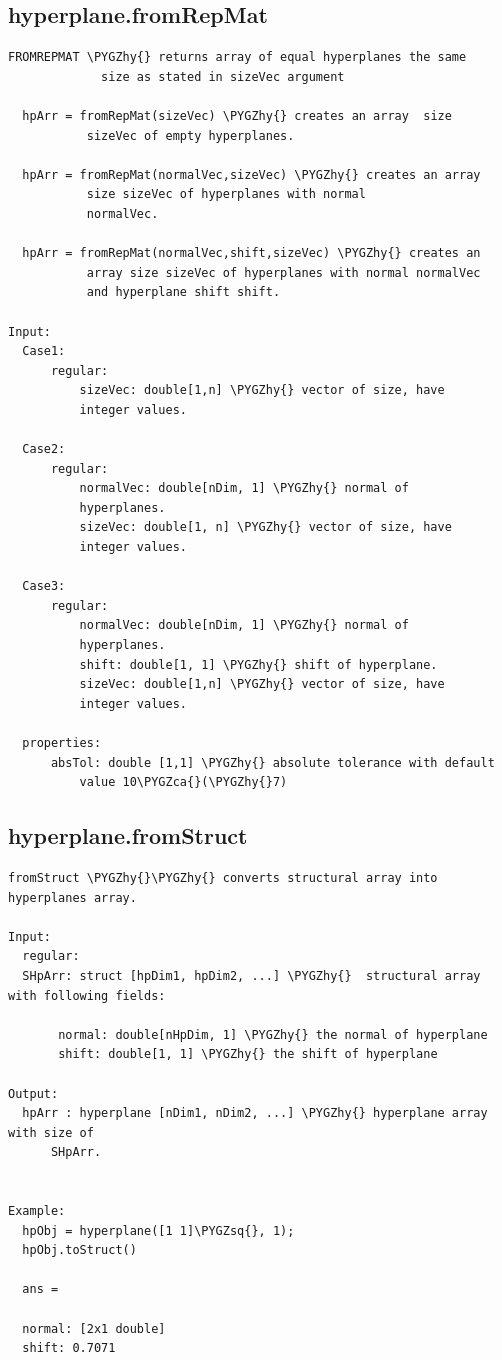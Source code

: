 \documentclass[letterpaper,10pt,english]{sphinxmanual}
\def\PYGZca{\char`\^}
\def\PYGZhy{\char`\-}
\def\PYGZsq{\char`\'}
\begin{document}
\subsection{hyperplane.fromRepMat}
\label{chap_functions:hyperplane-fromrepmat}
\begin{Verbatim}[commandchars=\\\{\}]
FROMREPMAT \PYGZhy{} returns array of equal hyperplanes the same
             size as stated in sizeVec argument

  hpArr = fromRepMat(sizeVec) \PYGZhy{} creates an array  size
           sizeVec of empty hyperplanes.

  hpArr = fromRepMat(normalVec,sizeVec) \PYGZhy{} creates an array
           size sizeVec of hyperplanes with normal
           normalVec.

  hpArr = fromRepMat(normalVec,shift,sizeVec) \PYGZhy{} creates an
           array size sizeVec of hyperplanes with normal normalVec
           and hyperplane shift shift.

Input:
  Case1:
      regular:
          sizeVec: double[1,n] \PYGZhy{} vector of size, have
          integer values.

  Case2:
      regular:
          normalVec: double[nDim, 1] \PYGZhy{} normal of
          hyperplanes.
          sizeVec: double[1, n] \PYGZhy{} vector of size, have
          integer values.

  Case3:
      regular:
          normalVec: double[nDim, 1] \PYGZhy{} normal of
          hyperplanes.
          shift: double[1, 1] \PYGZhy{} shift of hyperplane.
          sizeVec: double[1,n] \PYGZhy{} vector of size, have
          integer values.

  properties:
      absTol: double [1,1] \PYGZhy{} absolute tolerance with default
          value 10\PYGZca{}(\PYGZhy{}7)
\end{Verbatim}


\subsection{hyperplane.fromStruct}
\label{chap_functions:hyperplane-fromstruct}
\begin{Verbatim}[commandchars=\\\{\}]
fromStruct \PYGZhy{}\PYGZhy{} converts structural array into hyperplanes array.

Input:
  regular:
  SHpArr: struct [hpDim1, hpDim2, ...] \PYGZhy{}  structural array with following fields:

       normal: double[nHpDim, 1] \PYGZhy{} the normal of hyperplane
       shift: double[1, 1] \PYGZhy{} the shift of hyperplane

Output:
  hpArr : hyperplane [nDim1, nDim2, ...] \PYGZhy{} hyperplane array with size of
      SHpArr.


Example:
  hpObj = hyperplane([1 1]\PYGZsq{}, 1);
  hpObj.toStruct()

  ans =

  normal: [2x1 double]
  shift: 0.7071
\end{Verbatim}
\end{document}

